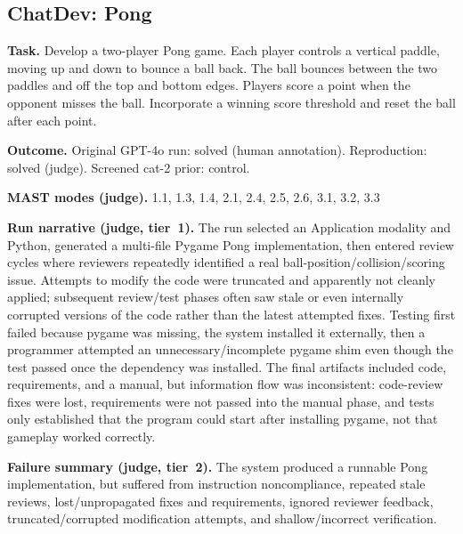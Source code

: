 \subsection*{ChatDev: Pong}
\textbf{Task.} Develop a two-player Pong game. Each player controls a vertical paddle, moving up and down to bounce a ball back. The ball bounces between the two paddles and off the top and bottom edges. Players score a point when the opponent misses the ball. Incorporate a winning score threshold and reset the ball after each point.

\textbf{Outcome.} Original GPT-4o run: solved (human annotation). Reproduction: solved (judge). Screened cat-2 prior: control.

\textbf{MAST modes (judge).} 1.1, 1.3, 1.4, 2.1, 2.4, 2.5, 2.6, 3.1, 3.2, 3.3

\textbf{Run narrative (judge, tier~1).} The run selected an Application modality and Python, generated a multi-file Pygame Pong implementation, then entered review cycles where reviewers repeatedly identified a real ball-position/collision/scoring issue. Attempts to modify the code were truncated and apparently not cleanly applied; subsequent review/test phases often saw stale or even internally corrupted versions of the code rather than the latest attempted fixes. Testing first failed because pygame was missing, the system installed it externally, then a programmer attempted an unnecessary/incomplete pygame shim even though the test passed once the dependency was installed. The final artifacts included code, requirements, and a manual, but information flow was inconsistent: code-review fixes were lost, requirements were not passed into the manual phase, and tests only established that the program could start after installing pygame, not that gameplay worked correctly.

\textbf{Failure summary (judge, tier~2).} The system produced a runnable Pong implementation, but suffered from instruction noncompliance, repeated stale reviews, lost/unpropagated fixes and requirements, ignored reviewer feedback, truncated/corrupted modification attempts, and shallow/incorrect verification.

